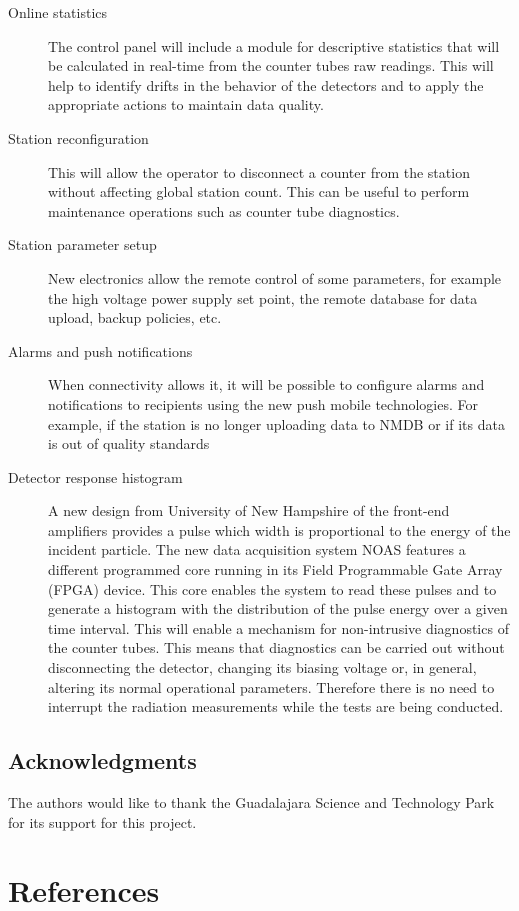 \documentclass[a4paper]{jpconf}
\begin{document}
\begin{description}
    \item[Online statistics] The control panel will include a module for
        descriptive statistics that will be calculated in real-time from the
        counter tubes raw readings. This will help to identify drifts in the
        behavior of the detectors and to apply the appropriate actions to
        maintain data quality.
    \item[Station reconfiguration] This will allow the operator to disconnect a
        counter from the station without affecting global station count. This
        can be useful to perform maintenance operations such as counter tube
        diagnostics. 
    \item[Station parameter setup] New electronics allow the remote control of
        some parameters, for example the high voltage power supply set point,
        the remote database for data upload, backup policies, etc.
    \item[Alarms and push notifications] When connectivity allows it, it will
        be possible to configure alarms and notifications to recipients using
        the new push mobile technologies. For example, if the station is no
        longer uploading data to NMDB or if its data is out of quality
        standards
    \item[Detector response histogram] A new design from University of New
        Hampshire of the front-end amplifiers provides a pulse which width is
        proportional to the energy of the incident particle. The new data
        acquisition system NOAS features a different programmed core running in
        its Field Programmable Gate Array (FPGA) device. This core enables the
        system to read these pulses and to generate a histogram with the
        distribution of the pulse energy over a given time interval. This will
        enable a mechanism for non-intrusive diagnostics of the counter tubes.
        This means that diagnostics can be carried out without disconnecting the
        detector, changing its biasing voltage or, in general, altering its
        normal operational parameters. Therefore there is no need to interrupt
        the radiation measurements while the tests are being conducted.
\end{description}


\subsection*{Acknowledgments} 

The authors would like to thank the Guadalajara Science and Technology Park for
its support for this project.


\section*{References}
 
\end{document}
